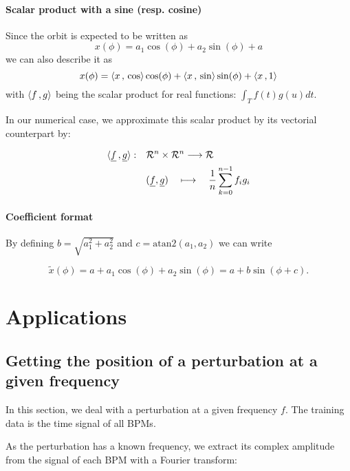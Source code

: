 \paragraph{Scalar product with a sine (resp. cosine)}
Since the orbit is expected to be written as
\begin{equation*}
x(\phi) = a_1 \cos(\phi) + a_2 \sin(\phi) + a
\end{equation*}
we can also describe it as
\begin{equation}
x(\phi) = \langle x {\,,\,} \cos \rangle \cos(\phi) + \langle x {\,,\,} \sin \rangle \sin(\phi) + \langle x {\,,\,} 1 \rangle
\end{equation}
with $\langle f {\,,\,} g \rangle$ being the scalar product for real functions: $\int_T f(t)g(u)dt$.

In our numerical case, we approximate this scalar product by its vectorial counterpart by:

\begin{align*}
\langle \underline{f} {\,,\,} \underline{g} \rangle: \quad
 &\mathcal{R}^n \times \mathcal{R}^n \longrightarrow \mathcal{R} \\
 & (\underline{f},\underline{g}) \quad\longmapsto \quad \frac{1}{n}\sum\limits_{k=0}^{n-1} f_i g_i
\end{align*}

\paragraph{Coefficient format}
By defining $b = \sqrt{a_1^2+a_2^2}$ and $c = \mathrm{atan2}(a_1, a_2)$  we can write

\begin{equation*}
\tilde{x}(\phi) = a + a_1 \cos(\phi) + a_2 \sin(\phi) = a + b \sin(\phi + c).
\end{equation*} 

\section{Applications}
\subsection{Getting the position of a perturbation at a given frequency}
In this section, we deal with a perturbation at a given frequency $f$. The training data is the time signal of all BPMs.

As the perturbation has a known frequency, we extract its complex amplitude from the signal of each BPM with a Fourier transform:

